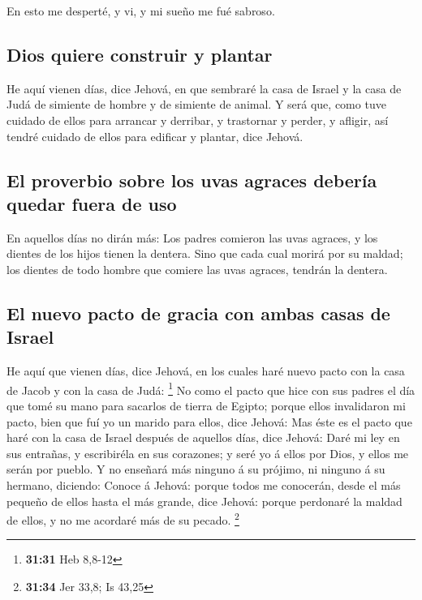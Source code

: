  En esto me desperté, y vi, y mi sueño me fué sabroso.

\hypertarget{dios-quiere-construir-y-plantar}{%
\subsection{Dios quiere construir y
plantar}\label{dios-quiere-construir-y-plantar}}

 He aquí vienen días, dice Jehová, en que sembraré la casa
de Israel y la casa de Judá de simiente de hombre y de simiente de
animal.  Y será que, como tuve cuidado de ellos para
arrancar y derribar, y trastornar y perder, y afligir, así tendré
cuidado de ellos para edificar y plantar, dice Jehová.

\hypertarget{el-proverbio-sobre-los-uvas-agraces-deberuxeda-quedar-fuera-de-uso}{%
\subsection{El proverbio sobre los uvas agraces debería quedar fuera de
uso}\label{el-proverbio-sobre-los-uvas-agraces-deberuxeda-quedar-fuera-de-uso}}

 En aquellos días no dirán más: Los padres comieron las
uvas agraces, y los dientes de los hijos tienen la dentera.
 Sino que cada cual morirá por su maldad; los dientes de
todo hombre que comiere las uvas agraces, tendrán la dentera.

\hypertarget{el-nuevo-pacto-de-gracia-con-ambas-casas-de-israel}{%
\subsection{El nuevo pacto de gracia con ambas casas de
Israel}\label{el-nuevo-pacto-de-gracia-con-ambas-casas-de-israel}}

 He aquí que vienen días, dice Jehová, en los cuales haré
nuevo pacto con la casa de Jacob y con la casa de Judá: \footnote{\textbf{31:31}
  Heb 8,8-12}  No como el pacto que hice con sus padres el
día que tomé su mano para sacarlos de tierra de Egipto; porque ellos
invalidaron mi pacto, bien que fuí yo un marido para ellos, dice Jehová:
 Mas éste es el pacto que haré con la casa de Israel
después de aquellos días, dice Jehová: Daré mi ley en sus entrañas, y
escribiréla en sus corazones; y seré yo á ellos por Dios, y ellos me
serán por pueblo.  Y no enseñará más ninguno á su prójimo,
ni ninguno á su hermano, diciendo: Conoce á Jehová: porque todos me
conocerán, desde el más pequeño de ellos hasta el más grande, dice
Jehová: porque perdonaré la maldad de ellos, y no me acordaré más de su
pecado. \footnote{\textbf{31:34} Jer 33,8; Is 43,25}

